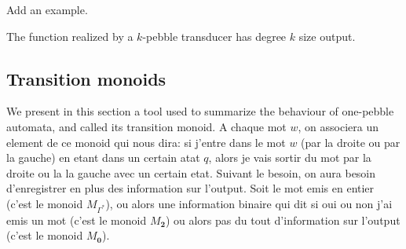 \begin{comment}

\begin{definition}
  We define, by induction on $k$ the function, realized by a $k$-pebble automaton. The case $k=1$ has been treated in Definition~\ref{def:1pebble}. 
  
  Consider a $k+1$ pebble transducer $\Tt$. We set $Q_i$ to be the set of states of $\Tt_i$.
  Let us define the image of a word $w$ of $\Sigma^*$ by the transduction realized by $\Tt$.
  
  \noindent Let $r=(q_j,\mathsf{pos}_j)_{j\in[1, n]}$ be the accepting run of $\Tt_{k+1}$ over $w$ and $(o_j)_{j\in[1, n]}$ be the outputs of the corresponding configurations.
  
  \noindent For every $q\in Q_i$, let $f^i_q:\Sigma_{[k,i+1]}^*\rightarrow \Gamma^*$ be the transduction realized by $\Tt[1,i]$, considering $q$ as its initial state.
   
   For every $j\in[1,n]$, let $w_j$ be the word obtained from $w$ by replacing the letter $a$ at position $\mathsf{pos}_j$ by $(a,k+1)$.
      For every $j\in[1,n]$, let $u_j$ be the word obtained from $o_j$ by replacing every state $q\in Q_i$ by $f^i_q(w_j)$.
      
  The image of $w$ by $\Tt$ is the word $(u_j)_{j\in[1,n]}$.
  \end{definition}

    
\end{comment}

\begin{example}
\begin{center}
Add an example.
\end{center}
\end{example}



\begin{proposition}[\cite{}]
The function realized by a $k$-pebble transducer has degree $k$ size output.
\end{proposition}

\subsection{Transition monoids}
We present in this section a tool used to summarize the behaviour of one-pebble automata, and called its transition monoid. A chaque mot $w$, on associera un element de ce monoid qui nous dira: si j'entre dans le mot $w$ (par la droite ou par la gauche) en etant dans un certain atat $q$, alors je vais sortir du mot par la droite ou la  la gauche avec un certain etat. Suivant le besoin, on aura besoin d'enregistrer en plus des information sur l'output. Soit le mot emis en entier (c'est le monoid $M_{\Gamma^*}$), ou alors une information binaire qui dit si oui ou non j'ai emis un mot (c'est le monoid $M_{\mathbf{2}}$) ou alors pas du tout d'information sur l'output (c'est le monoid $M_{\mathbf{0}}$).

